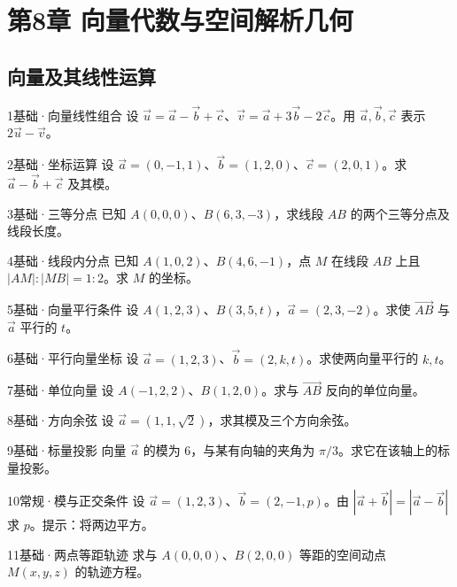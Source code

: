 \section{第8章 向量代数与空间解析几何}
\subsection{向量及其线性运算}
\begin{exercise}{1}{基础·向量线性组合}
设 $\vec u=\vec a-\vec b+\vec c$、$\vec v=\vec a+3\vec b-2\vec c$。用 $\vec a,\vec b,\vec c$ 表示 $2\vec u-\vec v$。
\end{exercise}
\begin{exercise}{2}{基础·坐标运算}
设 $\vec a=(0,-1,1)$、$\vec b=(1,2,0)$、$\vec c=(2,0,1)$。求 $\vec a-\vec b+\vec c$ 及其模。
\end{exercise}
\begin{exercise}{3}{基础·三等分点}
已知 $A(0,0,0)$、$B(6,3,-3)$，求线段 $AB$ 的两个三等分点及线段长度。
\end{exercise}
\begin{exercise}{4}{基础·线段内分点}
已知 $A(1,0,2)$、$B(4,6,-1)$，点 $M$ 在线段 $AB$ 上且 $|AM|:|MB|=1:2$。求 $M$ 的坐标。
\end{exercise}
\begin{exercise}{5}{基础·向量平行条件}
设 $A(1,2,3)$、$B(3,5,t)$，$\vec a=(2,3,-2)$。求使 $\overrightarrow{AB}$ 与 $\vec a$ 平行的 $t$。
\end{exercise}
\begin{exercise}{6}{基础·平行向量坐标}
设 $\vec a=(1,2,3)$、$\vec b=(2,k,t)$。求使两向量平行的 $k,t$。
\end{exercise}
\begin{exercise}{7}{基础·单位向量}
设 $A(-1,2,2)$、$B(1,2,0)$。求与 $\overrightarrow{AB}$ 反向的单位向量。
\end{exercise}
\begin{exercise}{8}{基础·方向余弦}
设 $\vec a=(1,1,\sqrt2)$，求其模及三个方向余弦。
\end{exercise}
\begin{exercise}{9}{基础·标量投影}
向量 $\vec a$ 的模为 $6$，与某有向轴的夹角为 $\pi/3$。求它在该轴上的标量投影。
\end{exercise}
\begin{exercise}{10}{常规·模与正交条件}
设 $\vec a=(1,2,3)$、$\vec b=(2,-1,p)$。由 $|\vec a+\vec b|=|\vec a-\vec b|$ 求 $p$。提示：将两边平方。
\end{exercise}
\begin{exercise}{11}{基础·两点等距轨迹}
求与 $A(0,0,0)$、$B(2,0,0)$ 等距的空间动点 $M(x,y,z)$ 的轨迹方程。
\end{exercise}
